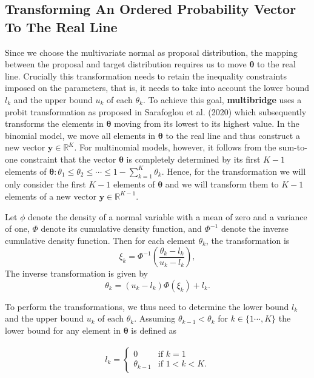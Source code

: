 \documentclass[
  english,
  man,floatsintext]{apa6}
\begin{document}
\begin{appendix}
\hypertarget{transforming-an-ordered-probability-vector-to-the-real-line}{%
\section{Transforming An Ordered Probability Vector To The Real
Line}\label{transforming-an-ordered-probability-vector-to-the-real-line}}

Since we choose the multivariate normal as proposal distribution, the
mapping between the proposal and target distribution requires us to move
\(\boldsymbol{\theta}\) to the real line. Crucially this transformation
needs to retain the inequality constraints imposed on the parameters,
that is, it needs to take into account the lower bound \(l_k\) and the
upper bound \(u_k\) of each \(\theta_k\). To achieve this goal,
\textbf{multibridge} uses a probit transformation as proposed in
Sarafoglou et al. (2020) which subsequently transforms the elements in
\(\boldsymbol{\theta}\) moving from its lowest to its highest value. In
the binomial model, we move all elements in \(\boldsymbol{\theta}\) to
the real line and thus construct a new vector
\(\boldsymbol{y} \in \mathbb{R}^{K}\). For multinomial models, however,
it follows from the sum-to-one constraint that the vector
\(\boldsymbol{\theta}\) is completely determined by its first \(K - 1\)
elements of
\(\boldsymbol{\theta}: \theta_1 \leq \theta_2 \leq \cdots \leq 1 - \sum_{k = 1}^K \theta_k\).
Hence, for the transformation we will only consider the first \(K - 1\)
elements of \(\boldsymbol{\theta}\) and we will transform them to
\(K - 1\) elements of a new vector
\(\boldsymbol{y} \in \mathbb{R}^{K - 1}\).

Let \(\phi\) denote the density of a normal variable with a mean of zero
and a variance of one, \(\Phi\) denote its cumulative density function,
and \(\Phi^{-1}\) denote the inverse cumulative density function. Then
for each element \(\theta_k\), the transformation is
\[\xi_k = \Phi^{-1}\left(\frac{\theta_k - l_k}{u_k - l_k}\right),\] The
inverse transformation is given by
\[\theta_k = (u_k - l_k) \Phi(\xi_k) + l_k.\]

To perform the transformations, we thus need to determine the lower
bound \(l_k\) and the upper bound \(u_k\) of each \(\theta_k\). Assuming
\(\theta_{k-1} < \theta_{k}\) for \(k \in \{1 \cdots, K\}\) the lower
bound for any element in \(\boldsymbol{\theta}\) is defined as

\begin{align*}
l_k = \left.
\begin{cases}
0 & \text{if } k = 1 \\
\theta_{k - 1} & \text{if } 1 < k < K.
\end{cases}
\right.
\end{align*}


\end{appendix}
\end{document}
